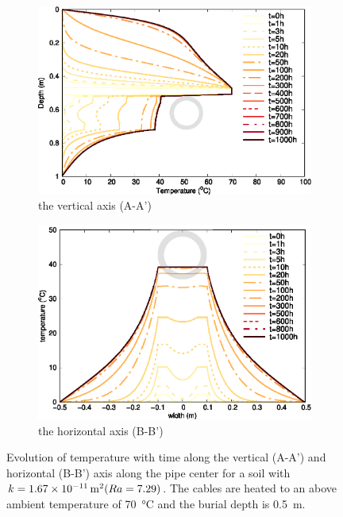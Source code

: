 \documentclass[Journal,letterpaper,InsideFigs]{ascelike-new}
\begin{document}
\begin{figure}
\centering
  \begin{subfigure}[b]{0.49\textwidth}
    \includegraphics[width=\textwidth]{figs/depth-temp.eps}
    \caption{the vertical axis (A-A’)}
    \label{fig:temp-vline}
 \end{subfigure}             
 \begin{subfigure}[b]{0.49\textwidth}
    \includegraphics[width=\textwidth]{figs/hline-temp.eps}
    \caption{the horizontal axis (B-B’)}
    \label{fig:temp-hline}
 \end{subfigure}
 
 \caption{Evolution of temperature with time along the vertical (A-A’) and horizontal (B-B’) axis along the pipe center for a soil with $k = \SI{1.67E-11}{\meter\squared} (Ra = 7.29)$. The cables are heated to an above ambient temperature of \SI{70}{\celsius} and the burial depth is \SI{0.5}{\meter}.}
 \label{fig:temp-depth-hline}
\end{figure}
\end{document}
